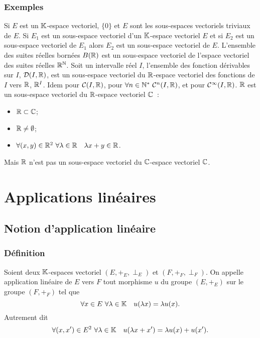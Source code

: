 \subsubsection{Exemples}
\label{subsec:exemples}

Si \(E\) est un \(\mathbb{K}\)-espace vectoriel, \(\{0\}\) et \(E\) sont les 
sous-espaces vectoriels triviaux de \(E\). Si \(E_1\) est un sous-espace 
vectoriel d'un \(\mathbb{K}\)-espace vectoriel \(E\) et si \(E_2\) est un sous-espace 
vectoriel de \(E_1\) alors \(E_2\) est un sous-espace vectoriel de \(E\). 
L'ensemble des suites réelles bornées \(B(\mathbb{R})\) est un sous-espace vectoriel de 
l'espace vectoriel des suites réelles \(\mathbb{R}^{\mathbb{N}}\). Soit un intervalle réel \(I\), 
l'ensemble des fonction dérivables sur \(I\), \(\mathcal{D}(I,\mathbb{R})\), est un 
sous-espace vectoriel du \(\mathbb{R}\)-espace vectoriel des fonctions de \(I\) vers 
\(\mathbb{R}\), \(\mathbb{R}^I\). Idem pour \(\mathcal{C}(I,\mathbb{R})\), pour \(\forall n \in \N^* \ 
\classe{n}(I,\R)\), et pour \(\mathcal{C}^{\infty}(I,\mathbb{R})\). \(\mathbb{R}\) est un sous-espace 
vectoriel du \(\mathbb{R}\)-espace vectoriel \(\mathbb{C}\)~:
\begin{itemize}
  \item \(\mathbb{R} \subset \mathbb{C}\);
  \item \(\mathbb{R} \neq \emptyset\);
  \item \(\forall (x,y) \in \mathbb{R}^2 \ \forall \lambda \in \mathbb{R} \quad \lambda x +y \in 
    \mathbb{R}\).
\end{itemize}

Mais \(\mathbb{R}\) n'est pas un sous-espace vectoriel du \(\mathbb{C}\)-espace vectoriel 
\(\mathbb{C}\).

\section{Applications linéaires}

\subsection{Notion d'application linéaire}

\subsubsection{Définition}

\begin{defdef}
  Soient deux \(\mathbb{K}\)-espaces vectoriel \((E,+_E,\perp_E)\) et 
  \((F,+_F,\perp_F)\). On appelle application linéaire de \(E\) vers \(F\) tout 
  morphisme \(u\) du groupe \((E,+_E)\) sur le groupe \((F,+_F)\) tel que
  \begin{equation}
    \forall x \in E \ \forall \lambda \in \mathbb{K} \quad u(\lambda x)=\lambda u(x).
  \end{equation}
  Autrement dit
  \begin{equation}
    \forall (x,x') \in E^2 \ \forall \lambda \in \mathbb{K} \quad u(\lambda x 
    +x')=\lambda u(x)+u(x').
  \end{equation}
\end{defdef}

